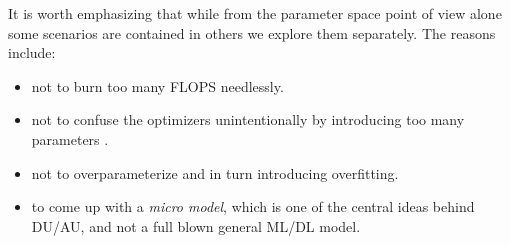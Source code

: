 \noindent It is worth emphasizing that while from the parameter space point of view alone some scenarios are contained in others we explore them separately. 
The reasons include:
\begin{itemize}
  \item not to burn too many \ac{FLOPS}\cite{Hager2010}\cite{Hennessy2019} needlessly.
  \item not to confuse the optimizers unintentionally by introducing too many parameters \cite{Sun2019}.
  \item not to overparameterize and in turn introducing overfitting\cite{Bishop2006}\cite{Goodfellow2016}\cite{ShalevShwartz2014}.
  \item to come up with a \emph{micro model}, which is one of the central ideas behind \ac{DU}/\ac{AU}\cite{Shechtman2015}, and not a full blown general \ac{ML}/\ac{DL} model.
\end{itemize}

